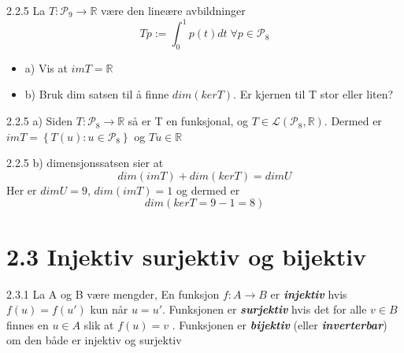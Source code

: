 \documentclass[a4paper,norsk]{article}
\begin{document}
\begin{oppgavebox}{2.2.5}{}
La $ T: \mathcal{P}_9 \rightarrow \mathbb{R} $ være den lineære avbildninger
\[
    Tp := \int_{0}^{1} p(t) dt \; \forall p \in \mathcal{P}_8 
\]

\begin{itemize}
  \item a) Vis at $ im T = \mathbb{R} $ 
  \item b) Bruk dim satsen til å finne $ dim \left( ker T \right)  $. Er kjernen til T stor eller liten?
\end{itemize}

\begin{proofbox}{2.2.5 a)}{}
Siden $ T : \mathcal{P}_8 \rightarrow \mathbb{R} $ så er T en funksjonal, og $ T \in \mathcal{L} \left( \mathcal{P}_8, \mathbb{R} \right)  $. Dermed er $ im T = \left\{ T \left( u \right) : u \in  \mathcal{P}_8 \right\}  $ og $ T u \in  \mathbb{R} $  
\end{proofbox}

\begin{proofbox}{2.2.5 b)}{}
dimensjonssatsen sier at
\[
    dim \left( im T \right) + dim \left( ker T \right) = dim U
\]
Her er $ dim U = 9 $, $ dim \left( im T \right)  = 1 $ og dermed er 
\[
    dim \left( ker T = 9 - 1 = 8 \right) 
\]
\end{proofbox}
\end{oppgavebox}

\section*{2.3 Injektiv surjektiv og bijektiv}
\begin{definitionbox}{2.3.1}{}
La A og B være mengder, En funksjon $ f: A \rightarrow B $ er \textbf{\textit{injektiv}} hvis $ f(u) = f(u') $ kun når $ u = u' $. Funksjonen er \textbf{\textit{surjektiv}} hvis det for alle $ v \in  B $ finnes en $ u \in  A $ slik at $ f(u) = v $ . Funksjonen er \textbf{\textit{bijektiv}} (eller \textbf{\textit{inverterbar}}) om den både er injektiv og surjektiv
\end{definitionbox}
\end{document}
